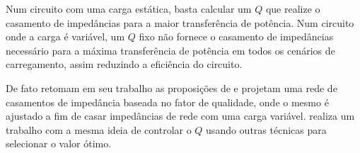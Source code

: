 Num circuito com uma carga estática, basta calcular um $Q$ que realize o casamento de impedâncias para a maior transferência de potência. Num circuito onde a carga é variável, um $Q$ fixo não fornece o casamento de impedâncias necessário para a máxima transferência de potência em todos os cenários de carregamento, assim reduzindo a eficiência do circuito. 

De fato \citeauthor{z-match-q} retomam em seu trabalho as proposições de \citeauthor{what-is-q-takashi} e projetam uma rede de casamentos de impedância baseada no fator de qualidade, onde o mesmo é ajustado a fim de casar impedâncias de rede com uma carga variável. \citeauthor{z-match-q-2} realiza um trabalho com a mesma ideia de controlar o $Q$ usando outras técnicas para selecionar o valor ótimo.





